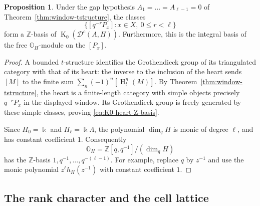 \documentclass[11pt]{article}
\theoremstyle{definition}
\newtheorem{prop}[thm]{Proposition}
\numberwithin{equation}{section}
\def\udgmod{\mbox{-\underline{gmod}}}
\newcommand{\kk}{\Bbbk}
\newcommand{\Dc}{\mathcal{D}^c(A,H)}
\newcommand{\K}{\operatorname{K}_0}
\newcommand{\mH}{\operatorname{H}}
\newcommand{\OH}{\mathbb{O}_H}
\begin{document}
\begin{prop}
\label{prop:K0-heart-basis}
Under the gap hypothesis $A_1=\dots=A_{\ell -1}=0$ of
Theorem~\ref{thm:window-tstructure}, the classes
\begin{equation}\label{eq:K0-heart-Z-basis}
 \{[q^{-r}P_x]:x\in X,\ 0\le r<\ell\}
\end{equation}
form a $\mathbb Z$-basis of $\K(\Dc)$.  Furthermore, this is the integral
basis of the free $\mathbb O_H$-module on the $[P_x]$.
\end{prop}
\begin{proof}
A bounded $t$-structure identifies the Grothendieck group of its
triangulated category with that of its heart: the inverse to the
inclusion of the heart sends $[M]$ to the finite sum
$\sum_n(-1)^n[\mH_t^n(M)]$.
By Theorem~\ref{thm:window-tstructure}, the heart is a finite-length
category with simple objects precisely $q^{-r}P_x$ in the displayed
window.  Its Grothendieck group is freely generated by these simple
classes, proving \eqref{eq:K0-heart-Z-basis}.

Since $H_0=\kk$ and $H_\ell=\kk\Lambda$, the polynomial
$\dim_q H$ is monic of degree $\ell$, and has constant
coefficient $1$.  Consequently
\[
 \mathbb O_H=\mathbb Z[q,q^{-1}]/(\dim_q H)
\]
has the $\mathbb Z$-basis $1,q^{-1},\ldots,q^{-(\ell-1)}$.
For example, replace $q$ by $z^{-1}$ and use the monic polynomial
$z^\ell h_H(z^{-1})$ with constant coefficient $1$.
\end{proof}

\subsection{The rank character and the cell lattice}
\label{sec:K0-rank}


\end{document}
